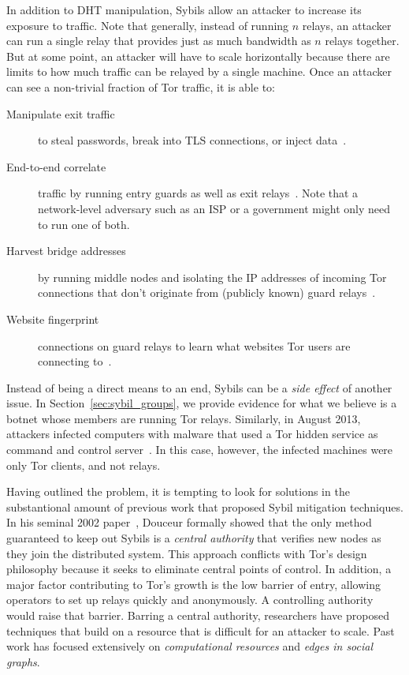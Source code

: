 In addition to DHT manipulation, Sybils allow an attacker to increase its
exposure to traffic.  Note that generally, instead of running $n$ relays, an
attacker can run a single relay that provides just as much bandwidth as $n$
relays together.  But at some point, an attacker will have to scale
horizontally because there are limits to how much traffic can be relayed by a
single machine.  Once an attacker can see a non-trivial fraction of Tor
traffic, it is able to:
\begin{description}
	\item[Manipulate exit traffic] to steal passwords, break into TLS
		connections, or inject data~\cite{Winter2014a}.
	\item[End-to-end correlate] traffic by running entry guards as well as exit
		relays~\cite{Johnson2013a}.  Note that a network-level adversary such as
		an ISP or a government might only need to run one of both.
	\item[Harvest bridge addresses] by running middle nodes and isolating the
		IP addresses of incoming Tor connections that don't originate from
		(publicly known) guard relays~\cite{Ling2012a}.
	\item[Website fingerprint] connections on guard relays to learn what
		websites Tor users are connecting to~\cite{Juarez2014a}.
\end{description}

Instead of being a direct means to an end, Sybils can be a \emph{side effect}
of another issue.  In Section~\ref{sec:sybil_groups}, we provide evidence for
what we believe is a botnet whose members are running Tor relays.  Similarly,
in August 2013, attackers infected computers with malware that used a Tor
hidden service as command and control server~\cite{Hopper2014a}.  In this case,
however, the infected machines were only Tor clients, and not relays.

Having outlined the problem, it is tempting to look for solutions in the
substantional amount of previous work that proposed Sybil mitigation techniques.
In his seminal 2002 paper~\cite{Douceur2002a}, Douceur formally showed that the
only method guaranteed to keep out Sybils is a \emph{central authority} that
verifies new nodes as they join the distributed system.  This approach conflicts
with Tor's design philosophy because it seeks to eliminate central points of
control.  In addition, a major factor contributing to Tor's growth is the low
barrier of entry, allowing operators to set up relays quickly and anonymously.
A controlling authority would raise that barrier.  Barring a central authority,
researchers have proposed techniques that build on a resource that is difficult
for an attacker to scale.  Past work has focused extensively on
\emph{computational resources} and \emph{edges in social graphs}.

